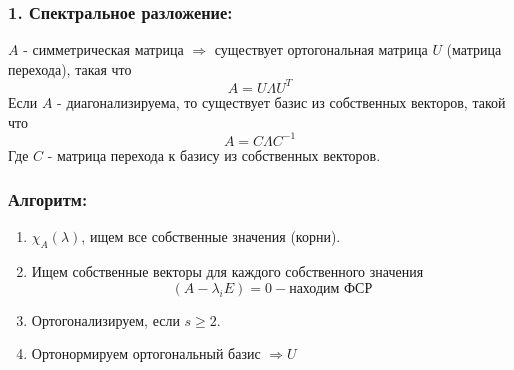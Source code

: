 \documentclass[12pt, letterpaper, twoside]{article}
\begin{document}
\subsubsection*{1. Спектральное разложение:}
    $A$ - симметрическая матрица $\Rightarrow$ существует ортогональная матрица $U$ (матрица перехода), такая что 
    \[A = U\Lambda U^T\]
    Если $A$ - диагонализируема, то существует базис из собственных векторов, такой что
    \[A = C\Lambda C^{-1}\]
    Где $C$ - матрица перехода к базису из собственных векторов.
\subsubsection*{Алгоритм:}
\begin{enumerate}
    \item $\chi_A(\lambda)$, ищем все собственные значения (корни).
    \item Ищем собственные векторы для каждого собственного значения
    \[(A - \lambda_i E) = 0 - \text{находим ФСР}\]
    \item Ортогонализируем, если $s \geq 2$.
    \item Ортонормируем ортогональный базис $\Rightarrow U$
\end{enumerate}
\end{document}
